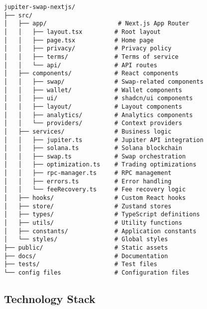 \documentclass[11pt,a4paper]{article}
\begin{document}
\begin{lstlisting}[style=bash, caption=Project Directory Structure]
jupiter-swap-nextjs/
├── src/
│   ├── app/                    # Next.js App Router
│   │   ├── layout.tsx         # Root layout
│   │   ├── page.tsx           # Home page
│   │   ├── privacy/           # Privacy policy
│   │   ├── terms/             # Terms of service
│   │   └── api/               # API routes
│   ├── components/            # React components
│   │   ├── swap/              # Swap-related components
│   │   ├── wallet/            # Wallet components
│   │   ├── ui/                # shadcn/ui components
│   │   ├── layout/            # Layout components
│   │   ├── analytics/         # Analytics components
│   │   └── providers/         # Context providers
│   ├── services/              # Business logic
│   │   ├── jupiter.ts         # Jupiter API integration
│   │   ├── solana.ts          # Solana blockchain
│   │   ├── swap.ts            # Swap orchestration
│   │   ├── optimization.ts    # Trading optimizations
│   │   ├── rpc-manager.ts     # RPC management
│   │   ├── errors.ts          # Error handling
│   │   └── feeRecovery.ts     # Fee recovery logic
│   ├── hooks/                 # Custom React hooks
│   ├── store/                 # Zustand stores
│   ├── types/                 # TypeScript definitions
│   ├── utils/                 # Utility functions
│   ├── constants/             # Application constants
│   └── styles/                # Global styles
├── public/                    # Static assets
├── docs/                      # Documentation
├── tests/                     # Test files
└── config files               # Configuration files
\end{lstlisting}

\subsection{Technology Stack}
\end{document}
